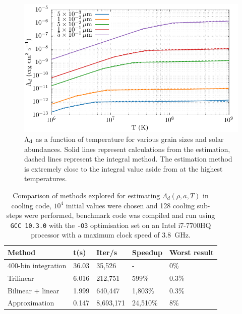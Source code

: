\begin{figure}[ht]
  \centering
  \includegraphics{assets/grain-transparency/lambda-comp.pdf}
  \caption[Electron transparency method accuracy -- $\Lambda\rms{d}$]{$\Lambda\rms{d}$ as a function of temperature for various grain sizes and solar abundances. Solid lines represent calculations from the \textcite{dwek_infrared_1981} estimation, dashed lines represent the integral method. The estimation method is extremely close to the integral value aside from at the highest temperatures.}
  \label{fig:lambda-comp-int-vs-est}
\end{figure}

\begin{table}[ht]
  \centering
  \begin{tabular}{lllll}
    \hline
    Method & t(s) & Iter/s & Speedup & Worst result \\ \hline
    400-bin integration & 36.03 & 35,526 & - & 0\% \\
    Trilinear & 6.016 & 212,751 & 599\% & 0.3\% \\
    Bilinear + linear & 1.999 & 640,447 & 1,803\% & 0.3\% \\
    Approximation & 0.147 & 8,693,171 & 24,510\% & 8\% \\ \hline
  \end{tabular}
  \caption[Dust cooling calculation comparison]{Comparison of methods explored for estimating $\Lambda_d(\rho,a,T)$ in cooling code, $10^4$ initial values were chosen and 128 cooling sub-steps were performed, benchmark code was compiled and run using \texttt{GCC 10.3.0} with the \texttt{-O3} optimisation set on an Intel i7-7700HQ processor with a maximum clock speed of \SI{3.8}{\giga\hertz}.}
  \label{tab:electron-speedup}
\end{table}

